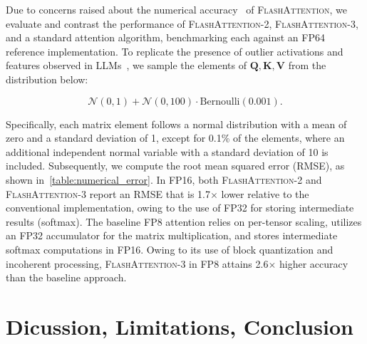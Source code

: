 \begin{algorithm}[H]
\begin{algorithmic}[1]
Due to concerns raised about the numerical accuracy~\citep{golden2024flash} of \textsc{FlashAttention}, we evaluate and contrast the performance of \textsc{FlashAttention-2}, \textsc{FlashAttention-3}, and a standard attention algorithm, benchmarking each against an FP64 reference implementation. To replicate the presence of outlier activations and features observed in LLMs~\citep{dettmers2208llm, sun2024massive}, we sample the elements of $\mathbf{Q}, \mathbf{K}, \mathbf{V}$ from the distribution below:

\begin{equation*}
  \mathcal{N}(0, 1) + \mathcal{N}(0, 100) \cdot \mathrm{Bernoulli}(0.001).
\end{equation*}

Specifically, each matrix element follows a normal distribution with a mean of zero and a standard deviation of 1, except for 0.1\% of the elements, where an additional independent normal variable with a standard deviation of 10 is included. Subsequently, we compute the root mean squared error (RMSE), as shown in~\cref{table:numerical_error}. In FP16, both \textsc{FlashAttention-2} and \textsc{FlashAttention-3} report an RMSE that is 1.7$\times$ lower relative to the conventional implementation, owing to the use of FP32 for storing intermediate results (softmax). The baseline FP8 attention relies on per-tensor scaling, utilizes an FP32 accumulator for the matrix multiplication, and stores intermediate softmax computations in FP16. Owing to its use of block quantization and incoherent processing, \textsc{FlashAttention-3} in FP8 attains 2.6$\times$ higher accuracy than the baseline approach.

\section{Dicussion, Limitations, Conclusion}
\label{sec:discussion}


\end{algorithmic}
\end{algorithm}

